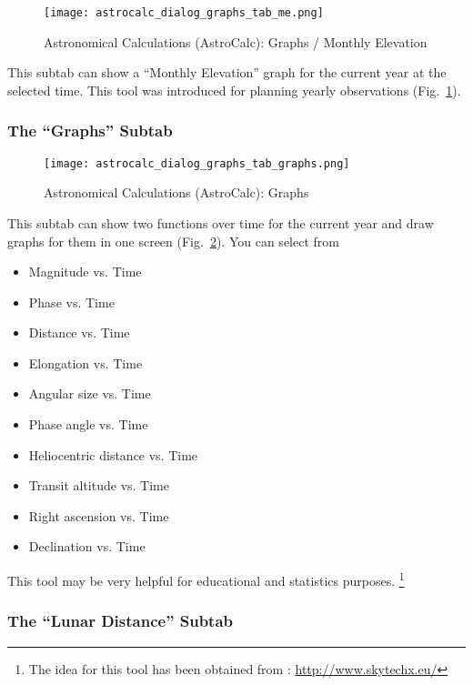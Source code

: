 \begin{figure}[htbp]
\centering\texttt{[image: astrocalc\_dialog\_graphs\_tab\_me.png]}
\caption{Astronomical Calculations (AstroCalc): Graphs / Monthly Elevation}
\label{fig:gui:AstroCalc:Graphs:ME}
\end{figure}

This subtab  can show a ``Monthly Elevation'' graph for the current year at the selected time.
This tool was introduced for planning yearly observations (Fig.~\ref{fig:gui:AstroCalc:Graphs:ME}).

\subsubsection{The ``Graphs'' Subtab}
\label{sec:gui:AstroCalc:Graphs:Graphs}
    
\begin{figure}[htbp]
\centering\texttt{[image: astrocalc\_dialog\_graphs\_tab\_graphs.png]}
\caption{Astronomical Calculations (AstroCalc): Graphs}
\label{fig:gui:AstroCalc:Graphs:Graphs}
\end{figure}
  
This subtab  can show two functions over time for the current year and draw graphs for them in one screen (Fig.~\ref{fig:gui:AstroCalc:Graphs:Graphs}). 
You can select from 
\begin{itemize}
\item Magnitude vs. Time
\item Phase vs. Time
\item Distance vs. Time 
\item Elongation vs. Time 
\item Angular size vs. Time
\item Phase angle vs. Time
\item Heliocentric distance vs. Time
\item Transit altitude vs. Time
\item Right ascension vs. Time
\item Declination vs. Time
\end{itemize}

This tool may be very helpful for educational and statistics purposes.%
	\footnote{The idea for this tool has been obtained from : \url{http://www.skytechx.eu/}}
	
\subsubsection{The ``Lunar Distance'' Subtab}
\label{sec:gui:AstroCalc:Graphs:LD}

